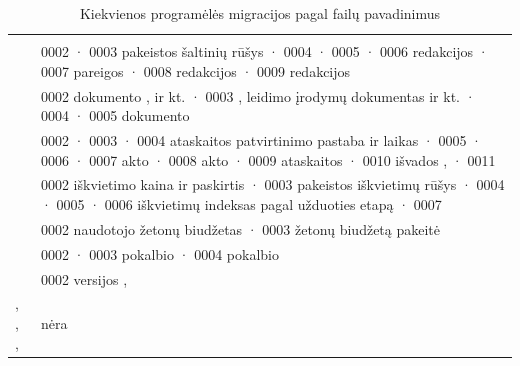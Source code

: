 \begin{xltabular}{\textwidth}{@{}L{20mm}Y@{}}
\caption{Kiekvienos programėlės migracijos pagal failų pavadinimus}\label{tab:data:migrations}\\
\toprule
{} &  \\
\midrule
\endfirsthead
\toprule
{} &  \\
\midrule
\endhead
\bottomrule
\endlastfoot
{} & 0002  · 0003 pakeistos šaltinių rūšys · 0004  · 0005  · 0006 redakcijos  · 0007 pareigos  · 0008 redakcijos  · 0009 redakcijos  \\
 & 0002 dokumento ,  ir kt. · 0003 , leidimo įrodymų dokumentas ir kt. · 0004  · 0005 dokumento  \\
 & 0002  · 0003  · 0004 ataskaitos patvirtinimo pastaba ir laikas · 0005  · 0006  · 0007 akto  · 0008 akto  · 0009 ataskaitos  · 0010 išvados ,  · 0011  \\
 & 0002 iškvietimo kaina ir paskirtis · 0003 pakeistos iškvietimų rūšys · 0004  · 0005  · 0006 iškvietimų indeksas pagal užduoties etapą · 0007  \\
 & 0002 naudotojo žetonų biudžetas · 0003 žetonų biudžetą pakeitė  \\
 & 0002  · 0003 pokalbio  · 0004 pokalbio  \\
 & 0002 versijos ,  \\
, , ,  & nėra \\
\end{xltabular}
